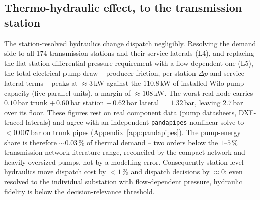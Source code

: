 \documentclass[a4paper,fleqn]{cas-dc}
\begin{document}
\subsection{Thermo-hydraulic effect, to the transmission station}
The station-resolved hydraulics change dispatch negligibly. Resolving the demand side
to all 174 transmission stations and their service laterals (L4), and replacing the
flat station differential-pressure requirement with a flow-dependent one (L5), the
total electrical pump draw -- producer friction, per-station $\Delta p$ and
service-lateral terms -- peaks at $\approx 3$\,kW against the $110.8$\,kW of installed
Wilo pump capacity (five parallel units), a margin of $\approx 108$\,kW. The worst
real node carries $0.10$\,bar trunk $+\,0.60$\,bar station $+\,0.62$\,bar lateral
$=1.32$\,bar, leaving $2.7$\,bar over its floor. These figures rest on real component
data (pump datasheets, DXF-traced laterals) and agree with an independent
\texttt{pandapipes} nonlinear solve to $<0.007$\,bar on trunk pipes
(Appendix~\ref{app:pandapipes}). The pump-energy share is therefore $\sim\!0.03$\,\%
of thermal demand -- two orders below the $1$--$5$\,\% transmission-network literature
range, reconciled by the compact network and heavily oversized pumps, not by a
modelling error. Consequently station-level hydraulics move dispatch cost by $<1$\,\%
and dispatch decisions by $\approx 0$: even resolved to the individual substation with
flow-dependent pressure, hydraulic fidelity is below the decision-relevance threshold.

\end{document}
